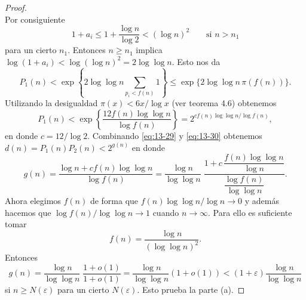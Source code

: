 \begin{proof}
\begin{equation*}
        \end{equation*}
        Por consiguiente
        \begin{equation*}
            1+a_i\leq1+\frac{\log n}{\log2}<(\log n)^2\qquad\text{si }n>n_1
        \end{equation*}
        para un cierto $n_1$. Entonces $n\geq n_1$ implica
        $\log(1+a_i)<\log(\log n)^2=2\log\log n$. Esto nos da
        \begin{equation*}
            P_1(n)<\exp\left\{2\log\log n\sum_{p_i<f(n)}1\right\}\leq\exp\{2\log\log n\,\pi(f(n))\}.
        \end{equation*}
        Utilizando la desigualdad $\pi(x)<6x/\log x$ (ver teorema 4.6) obtenemos
        \begin{equation}\label{eq:13-30}
            P_1(n)<\exp\left\{\frac{12f(n)\log\log n}{\log f(n)}\right\}=2^{cf(n)\log\log n/\log f(n)},
        \end{equation}
        en donde $c=12/\log2$. Combinando \eqref{eq:13-29} y \eqref{eq:13-30} obtenemos
        $d(n)=P_1(n)P_2(n)<2^{g(n)}$ en donde
        \begin{equation*}
            g(n)=\frac{\log n+cf(n)\log\log n}{\log f(n)}=\frac{\log n}{\log\log n}\;\frac{1+c\,\dfrac{f(n)\log\log n}{\log n}}{\dfrac{\log f(n)}{\log\log n}}.
        \end{equation*}
        Ahora elegimos $f(n)$ de forma que $f(n)\log\log n/\log n\to0$ y además hacemos que
        $\log f(n)/\log\log n\to1$ cuando $n\to\infty$. Para ello es suficiente tomar
        \begin{equation*}
            f(n)=\frac{\log n}{(\log\log n)^2}.
        \end{equation*}
        Entonces
        \begin{equation*}
            g(n)=\frac{\log n}{\log\log n}\;\frac{1+o(1)}{1+o(1)}=\frac{\log n}{\log\log n}(1+o(1))<(1+\varepsilon)\frac{\log n}{\log\log n}
        \end{equation*}
        si $n\geq N(\varepsilon)$ para un cierto $N(\varepsilon)$. Esto prueba la parte (a).


\end{proof}
